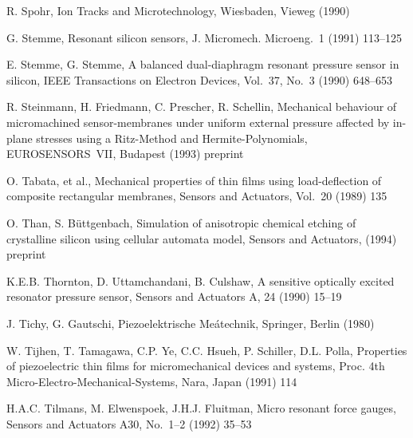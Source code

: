 \begin{thebibliography}{xxx}
 R. Spohr, Ion Tracks and Microtechnology, Wiesbaden, Vieweg (1990)


 G. Stemme, Resonant silicon sensors, J. Micromech. Microeng.~1 (1991)
 113--125

 E. Stemme, G. Stemme, A balanced dual-diaphragm resonant pressure sensor in
 silicon, IEEE Transactions on Electron Devices, Vol.~37, No.~3 (1990)
 648--653

 R. Steinmann, H. Friedmann, C. Prescher, R. Schellin, Mechanical behaviour
 of micromachined sensor-membranes under uniform external pressure affected
 by in-plane stresses using a Ritz-Method and Hermite-Polynomials,
 EUROSENSORS~VII, Budapest (1993) preprint

 O. Tabata, et al., Mechanical properties of thin films using load-deflection
 of composite rectangular membranes, Sensors and Actuators, Vol.~20 (1989)
 135

 O. Than, S. Büttgenbach, Simulation of anisotropic chemical etching of
 crystalline silicon using cellular automata model, Sensors and Actuators,
 (1994) preprint

 K.E.B. Thornton, D. Uttamchandani, B. Culshaw, A sensitive optically excited
 resonator pressure sensor, Sensors and Actuators A, 24 (1990) 15--19

 J. Tichy, G. Gautschi, Piezoelektrische Meátechnik, Springer,
 Berlin (1980)


 W. Tijhen, T. Tamagawa, C.P. Ye, C.C. Hsueh, P. Schiller, D.L. Polla,
 Properties of piezoelectric thin films for micromechanical devices and
 systems, Proc. 4th Micro-Electro-Mechanical-Systems, Nara, Japan (1991) 114


 H.A.C. Tilmans, M. Elwenspoek, J.H.J. Fluitman, Micro resonant force gauges,
 Sensors and Actuators A30, No.~1--2 (1992) 35--53


\end{thebibliography}
